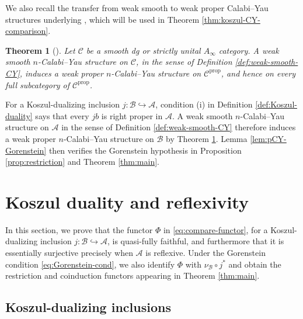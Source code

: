 \documentclass[11pt,letterpaper,reqno]{amsart}
\theoremstyle{plain}
\newtheorem{theorem}{Theorem}[section]
\theoremstyle{definition}
\theoremstyle{plain}
\theoremstyle{definition}
\numberwithin{equation}{section}
\begin{document}
We also recall the transfer from weak smooth to weak proper Calabi--Yau structures underlying \cite[Theorem 3.1]{Brav-Dyckerhoff2019}, which will be used in Theorem \ref{thm:koszul-CY-comparison}.

\begin{theorem}[{\cite[Theorem 3.1]{Brav-Dyckerhoff2019}}]\label{thm:smooth-proper-CY}
Let $\mathscr C$ be a smooth dg or strictly unital $A_\infty$ category.
A weak smooth $n$-Calabi--Yau structure on $\mathscr C$, in the sense of Definition \ref{def:weak-smooth-CY}, induces a weak proper $n$-Calabi--Yau structure on $\mathscr C^{\mathrm{prop}}$, and hence on every full subcategory of $\mathscr C^{\mathrm{prop}}$.	
\end{theorem}

For a Koszul-dualizing inclusion $j:\mathscr B\hookrightarrow\mathscr A$, condition (i) in Definition \ref{def:Koszul-duality} says that every $jb$ is right proper in $\mathscr A$.
A weak smooth $n$-Calabi--Yau structure on $\mathscr A$ in the sense of Definition \ref{def:weak-smooth-CY} therefore induces a weak proper $n$-Calabi--Yau structure on $\mathscr B$ by Theorem \ref{thm:smooth-proper-CY}.
Lemma \ref{lem:pCY-Gorenstein} then verifies the Gorenstein hypothesis in Proposition \ref{prop:restriction} and Theorem \ref{thm:main}.


\section{Koszul duality and reflexivity}\label{sec:koszul-reflexivity}

In this section, we prove that the functor $\Phi$ in \eqref{eq:compare-functor}, for a Koszul-dualizing inclusion $j:\mathscr B\hookrightarrow\mathscr A$, is quasi-fully faithful,
and furthermore that it is essentially surjective precisely when $\mathscr A$ is reflexive.
Under the Gorenstein condition \eqref{eq:Gorenstein-cond}, we also identify $\Phi$ with $\nu_{\mathscr B}\circ j^*$ and obtain the restriction and coinduction functors appearing in Theorem \ref{thm:main}.

\subsection{Koszul-dualizing inclusions}
\end{document}
